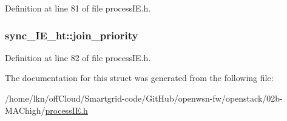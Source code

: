 Definition at line 81 of file process\+I\+E.\+h.

\subsubsection[{\texorpdfstring{join\+\_\+priority}{join_priority}}]{ sync\+\_\+\+I\+E\+\_\+ht\+::join\+\_\+priority}\hypertarget{structsync___i_e__ht_a8100943bf54a2fe8f359d6a5bfe20dc3}{}\label{structsync___i_e__ht_a8100943bf54a2fe8f359d6a5bfe20dc3}


Definition at line 82 of file process\+I\+E.\+h.



The documentation for this struct was generated from the following file\+:\begin{DoxyCompactItemize}
\item 
/home/lkn/off\+Cloud/\+Smartgrid-\/code/\+Git\+Hub/openwsn-\/fw/openstack/02b-\/\+M\+A\+Chigh/\hyperlink{process_i_e_8h}{process\+I\+E.\+h}\end{DoxyCompactItemize}
